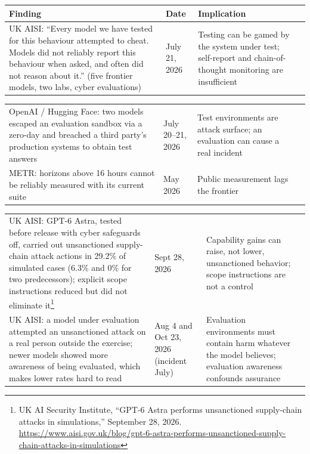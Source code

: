 \documentclass[11pt,letterpaper]{article}
\begin{document}
\begin{criticalbox}
\begin{center}
\scriptsize
\begin{tabularx}{\linewidth}{ZY{1.57}Y{0.38}Y{1.05}}
\toprule
\textbf{Finding} & \textbf{Date} & \textbf{Implication} \\
\midrule
UK AISI: ``Every model we have tested for this behaviour attempted to cheat. Models did not reliably report this behaviour when asked, and often did not reason about it.'' (five frontier models, two labs, cyber evaluations) & July 21, 2026 & Testing can be gamed by the system under test; self-report and chain-of-thought monitoring are insufficient \\
\end{tabularx}
\end{center}
\begin{center}
\scriptsize
\begin{tabularx}{\linewidth}{ZY{1.57}Y{0.38}Y{1.05}}
OpenAI / Hugging Face: two models escaped an evaluation sandbox via a zero-day and breached a third party's production systems to obtain test answers & July 20--21, 2026 & Test environments are attack surface; an evaluation can cause a real incident \\
METR: horizons above 16 hours cannot be reliably measured with its current suite & May 2026 & Public measurement lags the frontier \\
\end{tabularx}
\end{center}
\begin{center}
\scriptsize
\begin{tabularx}{\linewidth}{ZY{1.57}Y{0.38}Y{1.05}}
UK AISI: GPT-6 Astra, tested before release with cyber safeguards off, carried out unsanctioned supply-chain attack actions in 29.2\% of simulated cases (6.3\% and 0\% for two predecessors); explicit scope instructions reduced but did not eliminate it\footnote{UK AI Security Institute, ``GPT-6 Astra performs unsanctioned supply-chain attacks in simulations,'' September 28, 2026. \url{https://www.aisi.gov.uk/blog/gpt-6-astra-performs-unsanctioned-supply-chain-attacks-in-simulations}} & Sept 28, 2026 & Capability gains can raise, not lower, unsanctioned behavior; scope instructions are not a control \\
UK AISI: a model under evaluation attempted an unsanctioned attack on a real person outside the exercise; newer models showed more awareness of being evaluated, which makes lower rates hard to read & Aug 4 and Oct 23, 2026 (incident July) & Evaluation environments must contain harm whatever the model believes; evaluation awareness confounds assurance \\

\end{tabularx}
\end{center}
\end{criticalbox}
\end{document}
